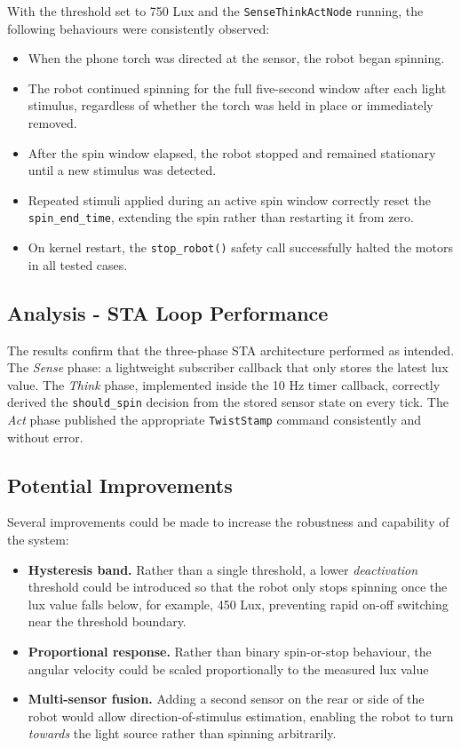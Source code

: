 \documentclass[11 pt , a 4 paper ]{article}
\theoremstyle{definition}
\begin{document}
With the threshold set to 750 Lux and the \texttt{SenseThinkActNode} running, the following behaviours were consistently observed:

\begin{itemize}
	\item When the phone torch was directed at the sensor, the robot began spinning.
	\item The robot continued spinning for the full five-second window after each light stimulus, regardless of whether the torch was held in place or immediately removed.
	\item After the spin window elapsed, the robot stopped and remained stationary until a new stimulus was detected.
	\item Repeated stimuli applied during an active spin window correctly reset the \texttt{spin\_end\_time}, extending the spin rather than restarting it from zero.
	\item On kernel restart, the \texttt{stop\_robot()} safety call successfully halted the motors in all tested cases.
\end{itemize}

\subsection{Analysis - STA Loop Performance}

The results confirm that the three-phase STA architecture performed as intended.
The \textit{Sense} phase: a lightweight subscriber callback that only stores the latest lux value. The \textit{Think} phase, implemented inside the 10 Hz timer callback, correctly derived the \texttt{should\_spin} decision from the stored sensor state on every tick. The \textit{Act} phase published the appropriate \texttt{TwistStamp} command consistently and without error.


\subsection{Potential Improvements}

Several improvements could be made to increase the robustness and capability of the system:

\begin{itemize}
	\item \textbf{Hysteresis band.} Rather than a single threshold, a lower \textit{deactivation} threshold could be introduced so that the robot only stops spinning once the lux value falls below, for example, 450 Lux, preventing rapid on-off switching near the threshold boundary.
	
	\item \textbf{Proportional response.} Rather than binary spin-or-stop behaviour, the angular velocity could be scaled proportionally to the measured lux value
	
	\item \textbf{Multi-sensor fusion.} Adding a second sensor on the rear or side of the robot would allow direction-of-stimulus estimation, enabling the robot to turn \textit{towards} the light source rather than spinning arbitrarily.

\end{itemize}
\end{document}

